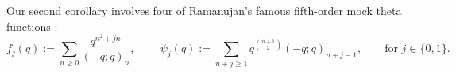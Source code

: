 \documentclass[reqno,11pt]{amsart}
\theoremstyle{definition}
\theoremstyle{remark}
\newtheorem*{remark}{Remark}
\numberwithin{equation}{section}
\newcommand{\la}{\left\langle}
\newcommand{\ra}{\right\rangle}
\begin{document}
Our second corollary involves four of Ramanujan's famous fifth-order mock theta functions \cite{watson1937mock,andrews1989ramanujan}:
\begin{equation} \label{eq:mock-theta}
f_j(q) := \sum_{n \ge 0} \frac{q^{n^2+jn}}{(-q; q)_n},
\qquad \
\psi_j(q) := \sum_{n+j \ge 1} q^{\binom{n+1}{2}} (-q; q)_{n+j-1}, \qquad\text{for } j \in \{0, 1\}.
\end{equation}
\end{document}

